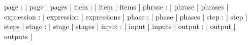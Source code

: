 \DefNoun  page              : | page               | pages                      |
\DefNoun  item              : | item               | items                      |
\DefNoun  phrase            : | phrase             | phrases                    |
\DefNoun  expression        : | expression         | expressions                |
\DefNoun  phase             : | phase              | phases                     |
\DefNoun  step              : | step               | steps                      |
\DefNoun  stage             : | stage              | stages                     |
\DefNoun  input             : | input              | inputs                     |
\DefNoun  output            : | output             | outputs                    |

